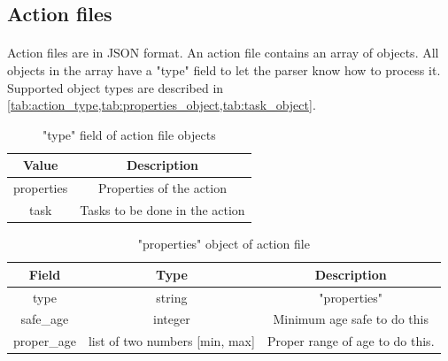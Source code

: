 \documentclass[mscthesis]{usiinfthesis}
\begin{document}
\subsection{Action files}
\paragraph{}
Action files are in JSON format. An action file contains an array of objects. All objects in the array have a "type" field to let the parser know how to process it. Supported object types are described in \cref{tab:action_type,tab:properties_object,tab:task_object}.

\begin{table}[H]
  \centering
  \begin{tabular}{|c|c|}
    \hline
    Value      & Description                    \\
    \hline
    properties & Properties of the action       \\
    task       & Tasks to be done in the action \\
    \hline
  \end{tabular}
  \caption{"type" field of action file objects}
  \label{tab:action_type}
\end{table}


\begin{table}[H]
  \centering
  \begin{tabular}{|c|c|c|}
    \hline
    Field       & Type                           & Description                     \\
    \hline
    type        & string                         & "properties"                    \\
    safe\_age   & integer                        & Minimum age safe to do this     \\
    proper\_age & list of two numbers [min, max] & Proper range of age to do this. \\
    \hline
  \end{tabular}
  \caption{"properties" object of action file}
  \label{tab:properties_object}
\end{table}
\end{document}
